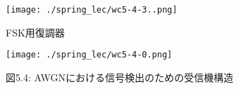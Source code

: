 \documentclass[dvipdfmx]{jsarticle}
\begin{document}
\begin{figure}[H]
\begin{center}
\texttt{[image: ./spring\_lec/wc5-4-3..png]}
\end{center}
\caption{FSK用復調器}
\end{figure}

\begin{figure}[H]
\begin{center}
\texttt{[image: ./spring\_lec/wc5-4-0.png]}
\end{center}
\caption*{図5.4: AWGNにおける信号検出のための受信機構造}
\end{figure}
\end{document}
